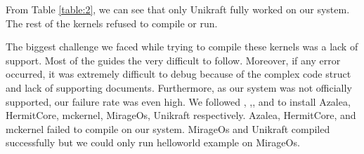 \documentclass[11pt]{article}       %
\begin{document}
\begin{table}[htbp]
\caption{Experiment with various kernels}
\label{table:2}
\end{table}


From Table \ref{table:2}, we can see that only Unikraft fully worked on our system. The rest of the kernels refused to compile or run. 

The biggest challenge we faced while trying to compile these kernels was a lack of support. Most of the guides the very difficult to follow. Moreover, if any error occurred, it was extremely difficult to debug because of the complex code struct and lack of supporting documents.  Furthermore, as our system was not officially supported, our failure rate was even high. We followed \cite{DEL22}, \cite{DEL23},\cite{DEL24}, \cite{DEL25}and \cite{DEL26}  to install  Azalea, HermitCore, mckernel, MirageOs, Unikraft respectively. Azalea, HermitCore, and mckernel failed to compile on our system. MirageOs and Unikraft compiled successfully but we could only run helloworld example on MirageOs. 
\end{document}
